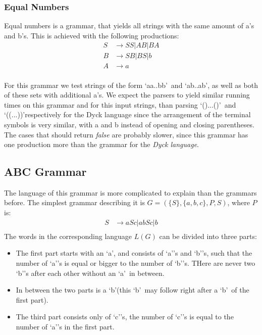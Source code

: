 \subsubsection{Equal Numbers}
Equal numbers is a grammar, that yields all strings with the same amount of a's and b's.
This is achieved with the following productions:
\begin{align*}
    S&\rightarrow SS|AB|BA\\
    B&\rightarrow SB|BS|b\\
    A&\rightarrow a\\
\end{align*}

For this grammar we test strings of the form \lq aa..bb\rq~and \lq ab..ab\rq, as well as both of these sets with additional a's.
We expect the parsers to yield similar running times on this grammar and for this input strings, than parsing \lq()...()\rq~and \lq((...))\rq respectively for the Dyck language
since the arrangement of the terminal symbols is very similar, with a and b instead of opening and closing parentheses.
The cases that should return \textit{false} are probably slower, since this grammar has one production more than the grammar for the \textit{Dyck language}.

\subsection{ABC Grammar}
The language of this grammar is more complicated to explain than the grammars before.
The simplest grammar describing it is $G=(\{S\}, \{a,b,c\},P,S)$, where $P$ is:
\begin{align*}
    S&\rightarrow aSc|abSc|b\\
\end{align*}
The words in the corresponding language $L(G)$ can be divided into three parts:
\begin{itemize}
    \item The first part starts with an \lq a\rq, and  consists of \lq a\rq 's and \lq b\rq 's, such that the number of \lq a\rq 's is equal or bigger to the number of \lq b\rq 's. THere are never two \lq b\rq 's after each other without an \lq a\rq~in between.
    \item In between the two parts is a \lq b\rq (this \lq b\rq~may follow right after a \lq b\rq~of the first part).
    \item The third part consists only of \lq c\rq 's, the number of \lq c\rq 's is equal to the number of \lq a\rq 's in the first part.
\end{itemize}


